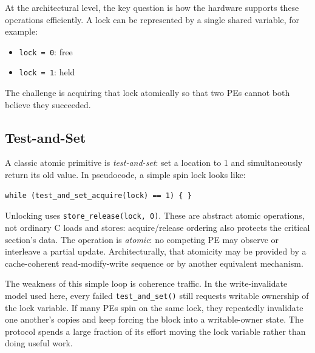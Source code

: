 At the architectural level, the key question is how the hardware supports these operations efficiently.
A lock can be represented by a single shared variable, for example:
\begin{itemize}
    \item \texttt{lock = 0}: free
    \item \texttt{lock = 1}: held
\end{itemize}
The challenge is acquiring that lock atomically so that two PEs cannot both believe they succeeded.

\subsection*{Test-and-Set}
A classic atomic primitive is \textit{test-and-set}: set a location to 1 and simultaneously return its old value.
In pseudocode, a simple spin lock looks like:
\begin{verbatim}
while (test_and_set_acquire(lock) == 1) { }
\end{verbatim}
Unlocking uses \texttt{store\_release(lock, 0)}.
These are abstract atomic operations, not ordinary C loads and stores: acquire/release ordering also protects the critical section's data.
The operation is \textit{atomic}: no competing PE may observe or interleave a partial update.
Architecturally, that atomicity may be provided by a cache-coherent read-modify-write sequence or by another equivalent mechanism.

The weakness of this simple loop is coherence traffic.
In the write-invalidate model used here, every failed \texttt{test\_and\_set()} still requests writable ownership of the lock variable.
If many PEs spin on the same lock, they repeatedly invalidate one another's copies and keep forcing the block into a writable-owner state.
The protocol spends a large fraction of its effort moving the lock variable rather than doing useful work.

